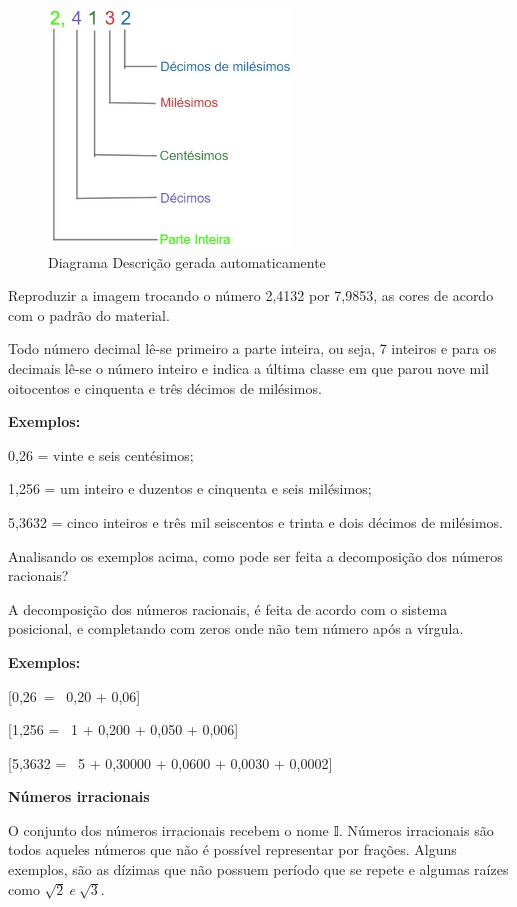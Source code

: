 \begin{figure}
\centering
\includegraphics[width=2.54167in,height=2.5in]{./imgSAEB_7_MAT/media/image1.png}
\caption{Diagrama Descrição gerada automaticamente}
\end{figure}

Reproduzir a imagem trocando o número 2,4132 por 7,9853, as cores de
acordo com o padrão do material.

Todo número decimal lê-se primeiro a parte inteira, ou seja, 7 inteiros
e para os decimais lê-se o número inteiro e indica a última classe em
que parou nove mil oitocentos e cinquenta e três décimos de milésimos.


\textbf{Exemplos:}

0,26 = vinte e seis centésimos;

1,256 = um inteiro e duzentos e cinquenta e seis milésimos;

5,3632 = cinco inteiros e três mil seiscentos e trinta e dois décimos de
milésimos.

Analisando os exemplos acima, como pode ser feita a decomposição dos
números racionais?

A decomposição dos números racionais, é feita de acordo com o sistema
posicional, e completando com zeros onde não tem número após a vírgula.~

\textbf{Exemplos:}

[0,26\  = \ 0,20 + 0,06]

[1,256 = \ 1 + 0,200 + 0,050 + 0,006]

[5,3632 = \ 5 + 0,30000 + 0,0600 + 0,0030 + 0,0002]

\textbf{Números irracionais}

O conjunto dos números irracionais recebem o nome 𝕀. Números irracionais
são todos aqueles números que não é possível representar por frações.
Alguns exemplos, são as dízimas que não possuem período que se repete e
algumas raízes como \(\sqrt{2}\ e\ \sqrt{3}\).~

